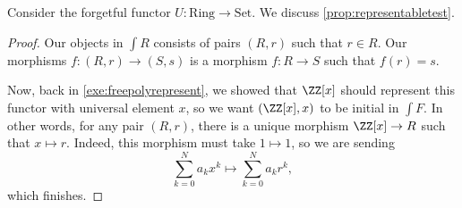 \documentclass[../notes.tex]{subfiles}
\begin{document}
\begin{exe}
	Consider the forgetful functor $U:\mathrm{Ring}\to\mathrm{Set}$. We discuss \autoref{prop:representabletest}.
\end{exe}
\begin{proof}
	Our objects in $\int R$ consists of pairs $(R,r)$ such that $r\in R$. Our morphisms $f:(R,r)\to(S,s)$ is a morphism $f:R\to S$ such that $f(r)=s$.

	Now, back in \autoref{exe:freepolyrepresent}, we showed that $\ZZ[x]$ should represent this functor with universal element $x$, so we want $(\ZZ[x],x)$ to be initial in $\int F$. In other words, for any pair $(R,r)$, there is a unique morphism $\ZZ[x]\to R$ such that $x\mapsto r$. Indeed, this morphism must take $1\mapsto1$, so we are sending
	\[\sum_{k=0}^Na_kx^k\longmapsto\sum_{k=0}^Na_kr^k,\]
	which finishes.
\end{proof}
\end{document}
